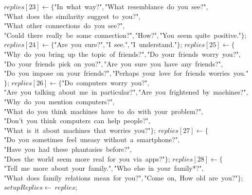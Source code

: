 \documentclass[a4paper,10pt]{article}
\begin{document}
\begin{algorithm}
\begin{algorithmic}[5]
  \State \(replies[23]\gets\{\)"{}In\ what\ way?"{}\(,\)"{}What\ resemblance\ do\ you\ see?"{}\(,\)"{}What\ does\ the\ similarity\ suggest\ to\ you?"{}\(,\)"{}What\ other\ connections\ do\ you\ see?"{}\(,\)"{}Could\ there\ really\ be\ some\ connection?"{}\(,\)"{}How?"{}\(,\)"{}You\ seem\ quite\ positive."{}\(\}\);
  \State \(replies[24]\gets\{\)"{}Are\ you\ sure?"{}\(,\)"{}I\ see."{}\(,\)"{}I\ understand."{}\(\}\);
  \State \(replies[25]\gets\{\)"{}Why\ do\ you\ bring\ up\ the\ topic\ of\ friends?"{}\(,\)"{}Do\ your\ friends\ worry\ you?"{}\(,\)"{}Do\ your\ friends\ pick\ on\ you?"{}\(,\)"{}Are\ you\ sure\ you\ have\ any\ friends?"{}\(,\)"{}Do\ you\ impose\ on\ your\ friends?"{}\(,\)"{}Perhaps\ your\ love\ for\ friends\ worries\ you."{}\(\}\);
  \State \(replies[26]\gets\{\)"{}Do\ computers\ worry\ you?"{}\(,\)"{}Are\ you\ talking\ about\ me\ in\ particular?"{}\(,\)"{}Are\ you\ frightened\ by\ machines?"{}\(,\)"{}Why\ do\ you\ mention\ computers?"{}\(,\)"{}What\ do\ you\ think\ machines\ have\ to\ do\ with\ your\ problem?"{}\(,\)"{}Don'{}t\ you\ think\ computers\ can\ help\ people?"{}\(,\)"{}What\ is\ it\ about\ machines\ that\ worries\ you?"{}\(\}\);
  \State \(replies[27]\gets\{\)"{}Do\ you\ sometimes\ feel\ uneasy\ without\ a\ smartphone?"{}\(,\)"{}Have\ you\ had\ these\ phantasies\ before?"{}\(,\)"{}Does\ the\ world\ seem\ more\ real\ for\ you\ via\ apps?"{}\(\}\);
  \State \(replies[28]\gets\{\)"{}Tell\ me\ more\ about\ your\ family."{}\(,\)"{}Who\ else\ in\ your\ family*?"{}\(,\)"{}What\ does\ family\ relations\ mean\ for\ you?"{}\(,\)"{}Come\ on,\ How\ old\ are\ you?"{}\(\}\);
  \State \(setupReplies\gets\ replies\);
\EndFunction
\end{algorithmic}
\end{algorithm}
\end{document}
